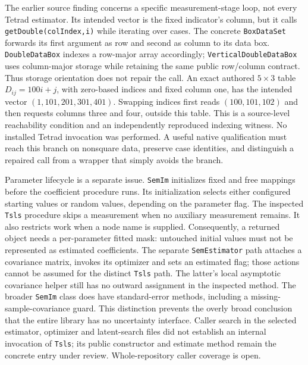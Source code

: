 The earlier source finding concerns a specific measurement-stage loop, not every Tetrad estimator. Its intended vector is the fixed indicator's column, but it calls \texttt{getDouble(colIndex,i)} while iterating over cases. The concrete \texttt{BoxDataSet} forwards its first argument as row and second as column to its data box. \texttt{DoubleDataBox} indexes a row-major array accordingly; \texttt{VerticalDoubleDataBox} uses column-major storage while retaining the same public row/column contract. Thus storage orientation does not repair the call. An exact authored $5\times3$ table $D_{ij}=100i+j$, with zero-based indices and fixed column one, has the intended vector $(1,101,201,301,401)$. Swapping indices first reads $(100,101,102)$ and then requests columns three and four, outside this table. This is a source-level reachability condition and an independently reproduced indexing witness. No installed Tetrad invocation was performed. A useful native qualification must reach this branch on nonsquare data, preserve case identities, and distinguish a repaired call from a wrapper that simply avoids the branch.\citep{exec25_javaiv_tetrad,exec25_javaiv_choice}

Parameter lifecycle is a separate issue. \texttt{SemIm} initializes fixed and free mappings before the coefficient procedure runs. Its initialization selects either configured starting values or random values, depending on the parameter flag. The inspected \texttt{Tsls} procedure skips a measurement when no auxiliary measurement remains. It also restricts work when a node name is supplied. Consequently, a returned object needs a per-parameter fitted mask: untouched initial values must not be represented as estimated coefficients. The separate \texttt{SemEstimator} path attaches a covariance matrix, invokes its optimizer and sets an estimated flag; those actions cannot be assumed for the distinct \texttt{Tsls} path. The latter's local asymptotic covariance helper still has no outward assignment in the inspected method. The broader \texttt{SemIm} class does have standard-error methods, including a missing-sample-covariance guard. This distinction prevents the overly broad conclusion that the entire library has no uncertainty interface. Caller search in the selected estimator, optimizer and latent-search files did not establish an internal invocation of \texttt{Tsls}; its public constructor and estimate method remain the concrete entry under review. Whole-repository caller coverage is open.\citep{exec25_javaiv_tetrad,exec22_java_latent_iv_preflight}

